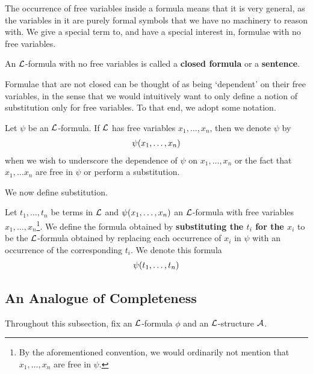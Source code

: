 The occurrence of free variables inside a formula means that it is very general, as the variables in it are purely formal symbols that we have no machinery to reason with. We give a special term to, and have a special interest in, formulae with no free variables.

\begin{boxdefinition}
    An $\mathcal{L}$-formula with no free variables is called a \textbf{closed formula} or a \textbf{sentence}.
\end{boxdefinition}

Formulae that are not closed can be thought of as being `dependent' on their free variables, in the sense that we would intuitively want to only define a notion of substitution only for free variables. To that end, we adopt some notation.

\begin{boxconvention}
    Let $\psi$ be an $\mathcal{L}$-formula. If $\mathcal{L}$ has free variables $x_1, \ldots, x_n$, then we denote $\psi$ by 
    \begin{align*}
        \psi\!\left( x_1, \ldots, x_n \right)
    \end{align*}
    when we wish to underscore the dependence of $\psi$ on $x_1, \ldots, x_n$ or the fact that $x_1, \ldots x_n$ are free in $\psi$ or perform a substitution.
\end{boxconvention}

We now define substitution.

\begin{boxdefinition}[Substitution]\label{Ch2:Def:Substitution}
    Let $t_1, \ldots, t_n$ be terms in $\mathcal{L}$ and $\psi\!\left( x_1, \ldots, x_n \right)$ an $\mathcal{L}$-formula with free variables $x_1, \ldots, x_n$\footnote{By the aforementioned convention, we would ordinarily not mention that $x_1, \ldots, x_n$ are free in $\psi$.}. We define the formula obtained by \textbf{substituting the $t_i$ for the $x_i$} to be the $\mathcal{L}$-formula obtained by replacing each occurrence of $x_i$ in $\psi$ with an occurrence of the corresponding $t_i$. We denote this formula
    \begin{align*}
        \psi\!\left( t_1, \ldots, t_n \right)
    \end{align*}
\end{boxdefinition}

\subsection{An Analogue of Completeness}

Throughout this subsection, fix an $\mathcal{L}$-formula $\phi$ and an $\mathcal{L}$-structure $\mathcal{A}$.

